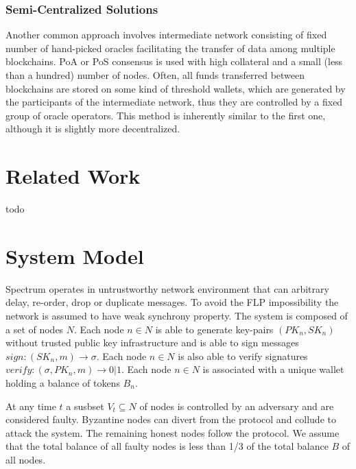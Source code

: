 \documentclass{article}
\begin{document}
\begin{sloppypar}
        \subsubsection{Semi-Centralized Solutions}\label{subsubsec:semi-centralized-solutions}

        Another common approach involves intermediate network consisting of fixed number of hand-picked oracles facilitating the transfer of data among multiple blockchains.
        PoA or PoS consensus is used with high collateral and a small (less than a hundred) number of nodes.
        Often, all funds transferred between blockchains are stored on some kind of threshold wallets, which are generated by the participants of the intermediate network, thus they are controlled by a fixed group of oracle operators.
        This method is inherently similar to the first one, although it is slightly more decentralized.


        \section{Related Work}\label{sec:related-work}

        todo


        \section{System Model}\label{sec:system-model}

        Spectrum operates in untrustworthy network environment that can arbitrary delay, re-order, drop or duplicate messages.
        To avoid the FLP impossibility the network is assumed to have weak synchrony property.
        The system is composed of a set of nodes $N$.
        Each node $n \in N$ is able to generate key-pairs ${(PK_n, SK_n)}$ without trusted public key infrastructure and is able to sign messages ${sign: (SK_n, m) \rightarrow \sigma}$.
        Each node $n \in N$ is also able to verify signatures ${verify: (\sigma, PK_n, m) \rightarrow 0 | 1}$.
        Each node $n \in N$ is associated with a unique wallet holding a balance of tokens $B_n$.

        At any time $t$ a susbset ${V_t \subseteq N}$ of nodes is controlled by an adversary and are considered faulty.
        Byzantine nodes can divert from the protocol and collude to attack the system.
        The remaining honest nodes follow the protocol.
        We assume that the total balance of all faulty nodes is less than 1/3 of the total balance $B$ of all nodes.


\end{sloppypar}
\end{document}
